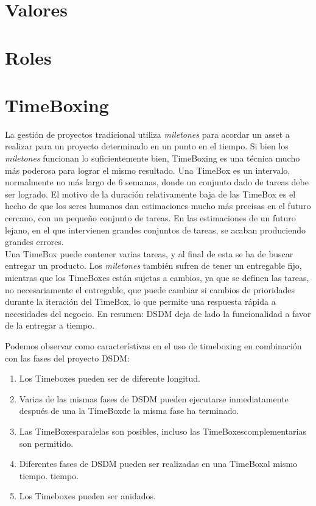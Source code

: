 \documentclass[12pt,a4paper]{article}
\begin{document}
\begin{itemize}
\section{Valores}

\section{Roles}

\section{TimeBoxing}
La gestión de proyectos tradicional utiliza \emph{miletones} para acordar un asset a realizar para un proyecto determinado en un punto en el tiempo. Si bien los  \emph{miletones} funcionan lo suficientemente bien, TimeBoxing es una técnica mucho más poderosa para lograr el mismo resultado. Una TimeBox es un intervalo, normalmente no más largo de 6 semanas, donde un conjunto dado de tareas debe ser logrado. El motivo de la duración relativamente baja de las TimeBox es el hecho de que los seres humanos dan estimaciones mucho más precisas en el futuro cercano, con un pequeño conjunto de tareas.
En las estimaciones de un futuro lejano, en el que intervienen grandes conjuntos de tareas, se acaban produciendo grandes errores.\\

 Una TimeBox puede contener varias tareas, y al final de esta se ha de buscar entregar un producto. Los  \emph{miletones} también
sufren de tener un entregable fijo, mientras que los TimeBoxes están sujetas a cambios, ya que
se definen las tareas, no necesariamente el entregable, que puede cambiar si cambios de prioridades durante la iteración del TimeBox, lo que permite una respuesta rápida a
necesidades del negocio. En resumen: DSDM deja de lado la funcionalidad a favor de la entregar a tiempo. 

Podemos observar como característivas en el uso de timeboxing en combinación con las fases del proyecto DSDM:
\begin{enumerate}
	\item  Los Timeboxes pueden ser de diferente longitud.
	\item  Varias de las mismas fases de DSDM pueden ejecutarse inmediatamente después de una
la TimeBoxde la misma fase ha terminado.
\item Las TimeBoxesparalelas son posibles, incluso las TimeBoxescomplementarias son
permitido.
\item Diferentes fases de DSDM pueden ser realizadas en una TimeBoxal mismo tiempo.
tiempo.
\item Los Timeboxes pueden ser anidados.
\end{enumerate}


\end{itemize}
\end{document}
